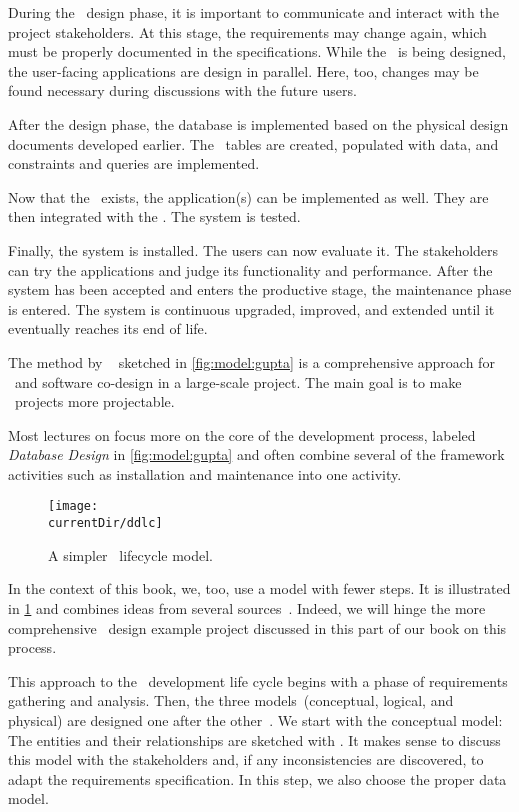 During the \db\ design phase, it is important to communicate and interact with the project stakeholders.
At this stage, the requirements may change again, which must be properly documented in the specifications.
While the \db\ is being designed, the user-facing applications are design in parallel.
Here, too, changes may be found necessary during discussions with the future users.

After the design phase, the database is implemented based on the physical design documents developed earlier.
The \db\ tables are created, populated with data, and constraints and queries are implemented.

Now that the \db\ exists, the application(s) can be implemented as well.
They are then integrated with the \db.
The system is tested.

Finally, the system is installed.
The users can now evaluate it.
The stakeholders can try the applications and judge its functionality and performance.
After the system has been accepted and enters the productive stage, the maintenance phase is entered.
The system is continuous upgraded, improved, and extended until it eventually reaches its end of life.

The method by \citeauthor{GMTM2011DDLC}~\cite{GMTM2011DDLC} sketched in \cref{fig:model:gupta} is a comprehensive approach for \db\ and software co-design in a large-scale project.
The main goal is to make \db\ projects more projectable.

Most lectures on  focus more on the core of the development process, labeled \emph{Database Design} in \cref{fig:model:gupta} and often combine several of the framework activities such as installation and maintenance into one activity.

\begin{figure}%
\centering%
\texttt{[image: \\currentDir/ddlc]}%
\caption{A simpler \db\ lifecycle model.}%
\label{fig:model:ddlc}%
\end{figure}%

In the context of this book, we, too, use a model with fewer steps.
It is illustrated in \cref{fig:model:ddlc} and combines ideas from several sources~\cite{SS2005EIDDDFDB:I,SS2005EIDDDFDB:CDDRAAML,D2022DN:DRA}.
Indeed, we will hinge the more comprehensive \db\ design example project discussed in this part of our book on this process.

This approach to the \db\ development life cycle begins with a phase of requirements gathering and analysis.
Then, the three models~(conceptual, logical, and physical) are designed one after the other~\cite{EN2015FODS}.
We start with the conceptual model:
The entities and their relationships are sketched with .
It makes sense to discuss this model with the stakeholders and, if any inconsistencies are discovered, to adapt the requirements specification.
In this step, we also choose the proper data model.

